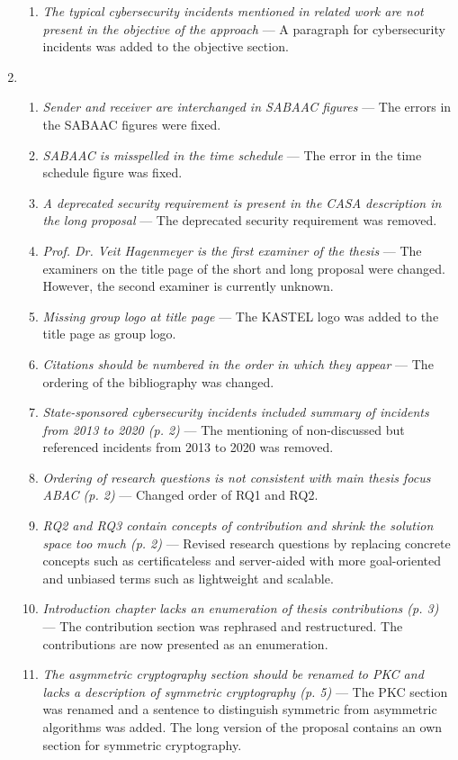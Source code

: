 \begin{enumerate}[label=R\arabic*.]
\begin{enumerate}[label=Q\arabic*.]
        \item \textit{The typical cybersecurity incidents mentioned in related work are not present in the objective of the approach} --- A paragraph for cybersecurity incidents was added to the objective section.
    \end{enumerate}
    \item \begin{enumerate}[label=Q\arabic*.]
        \item \textit{Sender and receiver are interchanged in SABAAC figures} --- The errors in the SABAAC figures were fixed.
        \item \textit{SABAAC is misspelled in the time schedule} --- The error in the time schedule figure was fixed.
        \item \textit{A deprecated security requirement is present in the CASA description in the long proposal} --- The deprecated security requirement was removed.
        \item \textit{Prof. Dr. Veit Hagenmeyer is the first examiner of the thesis} --- The examiners on the title page of the short and long proposal were changed. However, the second examiner is currently unknown.
        \item \textit{Missing group logo at title page} --- The KASTEL logo was added to the title page as group logo.
        \item \textit{Citations should be numbered in the order in which they appear} --- The ordering of the bibliography was changed.
        \item \textit{State-sponsored cybersecurity incidents included summary of incidents from 2013 to 2020 (p. 2)} --- The mentioning of non-discussed but referenced incidents from 2013 to 2020 was removed.
        \item \textit{Ordering of research questions is not consistent with main thesis focus ABAC (p. 2)} --- Changed order of RQ1 and RQ2.
        \item \textit{RQ2 and RQ3 contain concepts of contribution and shrink the solution space too much (p. 2)} --- Revised research questions by replacing concrete concepts such as certificateless and server-aided with more goal-oriented and unbiased terms such as lightweight and scalable.
        \item \textit{Introduction chapter lacks an enumeration of thesis contributions (p. 3)} --- The contribution section was rephrased and restructured. The contributions are now presented as an enumeration.
        \item \textit{The asymmetric cryptography section should be renamed to PKC and lacks a description of symmetric cryptography (p. 5)} --- The PKC section was renamed and a sentence to distinguish symmetric from asymmetric algorithms was added. The long version of the proposal contains an own section for symmetric cryptography.

\end{enumerate}
\end{enumerate}
